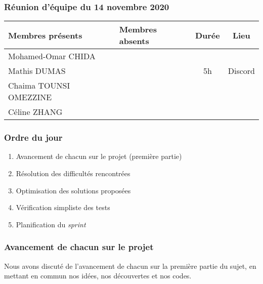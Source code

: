 


% 
\subsubsection*{\large{Réunion d'équipe du 14 novembre 2020}}
\begin{center}
\begin{tabular}{| l | l || c | c |}
    \hline
    Membres présents & Membres absents & Durée & Lieu \\
    \hline
    Mohamed-Omar CHIDA & & & \\ Mathis DUMAS & & 5h & Discord  \\ Chaima TOUNSI OMEZZINE & & & \\ Céline ZHANG & & &\\
    \hline
\end{tabular}
\end{center}

\subsubsection*{Ordre du jour}
\begin{enumerate}
    \item Avancement de chacun sur le projet (première partie)
    \item Résolution des difficultés rencontrées
    \item Optimisation des solutions proposées
    \item Vérification simpliste des tests
    \item Planification du \textsl{sprint}
\end{enumerate}

\subsubsection*{Avancement de chacun sur le projet}
Nous avons discuté de l'avancement de chacun sur la première partie du sujet, en mettant en commun nos idées, nos découvertes et nos codes.

